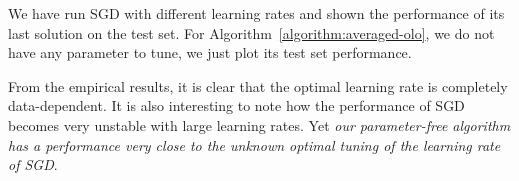 We have run \ac{SGD} with different learning rates and shown the performance of its last solution on the test set. For Algorithm~\ref{algorithm:averaged-olo}, we do not have any parameter to tune, we just plot its test set performance.

From the empirical results, it is clear that the optimal learning rate is completely
data-dependent. It is also interesting to note how the performance of \ac{SGD} becomes very unstable with large learning rates. Yet \emph{our parameter-free algorithm has a performance very close
to the unknown optimal tuning of the learning rate of \ac{SGD}}.

